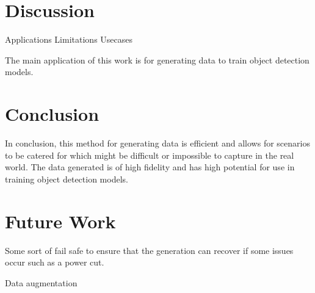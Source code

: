 \documentclass[10pt,twocolumn,letterpaper]{article}
\begin{document}
\section{Discussion}

Applications Limitations Usecases

The main application of this work is for generating data to train object detection models. 

\section{Conclusion}

In conclusion, this method for generating data is efficient and allows for scenarios to be catered for which might be difficult or impossible to capture in the real world. The data generated is of high fidelity and has high potential for use in training object detection models.

\section{Future Work}

Some sort of fail safe to ensure that the generation can recover if some issues occur such as a power cut.

Data augmentation

{
    \small
    
    
}

% 
\end{document}
